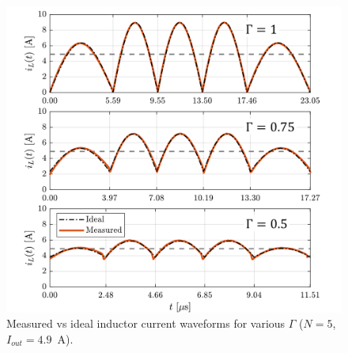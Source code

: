 \begin{figure}[t]
 \vspace{-30pt}
\hspace{-20pt}
\begin{minipage}[H]{0.35\linewidth}
     \centering
    \includegraphics[width=1\linewidth]{Figures/MeasWaveforms_all_a.png}
    \caption{Measured vs ideal inductor current waveforms for various $\Gamma$ ($N=5$, $I_{out}=4.9$~A).}
    \label{fig:iL_meas}
\end{minipage}
\hfill
\begin{minipage}[H]{0.3\linewidth}


\end{minipage}
\end{figure}

